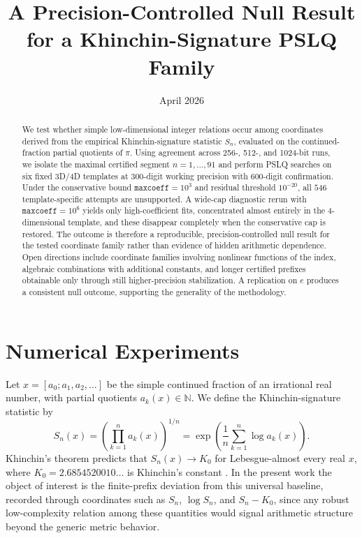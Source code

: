 \documentclass[11pt]{article}
\title{A Precision-Controlled Null Result for a Khinchin-Signature PSLQ Family}
\author{}
\date{April 2026}
\begin{document}
\maketitle

\begin{abstract}
We test whether simple low-dimensional integer relations occur among coordinates derived from the empirical Khinchin-signature statistic $S_n$, evaluated on the continued-fraction partial quotients of $\pi$. Using agreement across 256-, 512-, and 1024-bit runs, we isolate the maximal certified segment $n=1,\ldots,91$ and perform PSLQ searches on six fixed 3D/4D templates at 300-digit working precision with 600-digit confirmation. Under the conservative bound $\texttt{maxcoeff}=10^3$ and residual threshold $10^{-20}$, all $546$ template-specific attempts are unsupported. A wide-cap diagnostic rerun with $\texttt{maxcoeff}=10^6$ yields only high-coefficient fits, concentrated almost entirely in the 4-dimensional template, and these disappear completely when the conservative cap is restored. The outcome is therefore a reproducible, precision-controlled null result for the tested coordinate family rather than evidence of hidden arithmetic dependence. Open directions include coordinate families involving nonlinear functions of the index, algebraic combinations with additional constants, and longer certified prefixes obtainable only through still higher-precision stabilization. A replication on $e$ produces a consistent null outcome, supporting the generality of the methodology.
\end{abstract}

\section{Numerical Experiments}\label{sec:numerics}

Let $x=[a_0;a_1,a_2,\ldots]$ be the simple continued fraction of an irrational real number, with partial quotients $a_k(x)\in\mathbb{N}$. We define the Khinchin-signature statistic by
\[
S_n(x)=\left(\prod_{k=1}^n a_k(x)\right)^{1/n}=\exp\!\left(\frac{1}{n}\sum_{k=1}^n \log a_k(x)\right).
\]
Khinchin's theorem predicts that $S_n(x)\to K_0$ for Lebesgue-almost every real $x$, where $K_0=2.6854520010\ldots$ is Khinchin's constant \cite{BaileyBorweinCrandall1997,FlajoletVallee2000}. In the present work the object of interest is the finite-prefix deviation from this universal baseline, recorded through coordinates such as $S_n$, $\log S_n$, and $S_n-K_0$, since any robust low-complexity relation among these quantities would signal arithmetic structure beyond the generic metric behavior.
\end{document}
